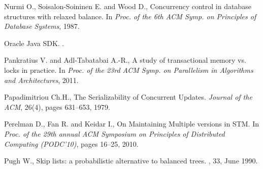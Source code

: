 \begin{thebibliography}{99}
{%



Nurmi O., Soisalon-Soininen E. and Wood D.,
\newblock Concurrency control in database structures with relaxed balance.
\newblock In {\em Proc. of the 6th ACM Symp. on Principles of Database
  Systems}, 1987.

% 


Oracle Java SDK.
.



Pankratius V. and Adl-Tabatabai A.-R.,
\newblock A study of transactional memory vs. locks in practice.
\newblock In {\em Proc. of the 23rd ACM Symp. on Parallelism in Algorithms and
  Architectures}, 2011.



Papadimitriou Ch.H., 
The Serializability of Concurrent Updates. 
{\it Journal of the ACM},  26(4), pages 631--653, 1979. 





Perelman D., Fan R. and Keidar I., 
On Maintaining Multiple versions in STM. 
In {\em  Proc. of the  29th  annual  ACM    Symposium  on Principles  of Distributed
Computing (PODC'10)}, pages 16--25, 2010. 



Pugh W.,
\newblock Skip lists: a probabilistic alternative to balanced trees.
, 33, June 1990.




}
\end{thebibliography}

